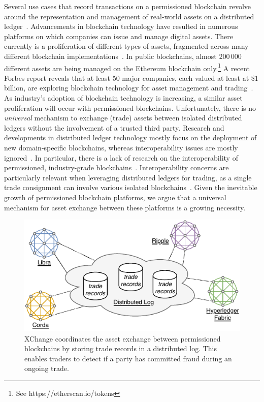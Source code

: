 Several use cases that record transactions on a permissioned blockchain revolve around the representation and management of real-world assets on a distributed ledger~\cite{hewett2019inclusive}.
Advancements in blockchain technology have resulted in numerous platforms on which companies can issue and manage digital assets.
There currently is a proliferation of different types of assets, fragmented across many different blockchain implementations~\cite{borkowski2018towards}.
In public blockchains, almost 200\,000 different assets are being managed on the Ethereum blockchain only.\footnote{See https://etherscan.io/tokens}
A recent Forbes report reveals that at least 50 major companies, each valued at least at \$1 billion, are exploring blockchain technology for asset management and trading~\cite{forbes50companies}.
As industry's adoption of blockchain technology is increasing, a similar asset proliferation will occur with permissioned blockchains.
Unfortunately, there is no \emph{universal} mechanism to exchange (trade) assets between isolated distributed ledgers without the involvement of a trusted third party.
Research and developments in distributed ledger technology mostly focus on the deployment of new domain-specific blockchains, whereas interoperability issues are mostly ignored~\cite{schulte2019towards,yli2016current}.
In particular, there is a lack of research on the interoperability of permissioned, industry-grade blockchains~\cite{nikander2019interledger,vo2018internet}.
Interoperability concerns are particularly relevant when leveraging distributed ledgers for trading, as a single trade consignment can involve various isolated blockchains~\cite{ganne2018can}.
Given the inevitable growth of permissioned blockchain platforms, we argue that a universal mechanism for asset exchange between these platforms is a growing necessity.

\begin{figure}[t]
	\centering
	\includegraphics[width=.75\linewidth]{xchange/assets/xchange_interoperability}
	\caption{XChange coordinates the asset exchange between permissioned blockchains by storing trade records in a distributed log. This enables traders to detect if a party has committed fraud during an ongoing trade.}
	\label{fig:xchange_interoperability}
\end{figure}

